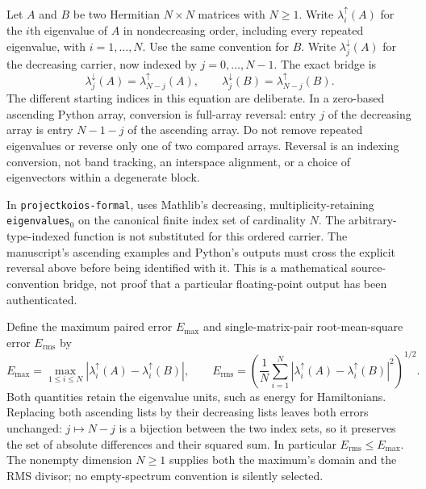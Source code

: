 Let $A$ and $B$ be two Hermitian $N\times N$ matrices with $N\geq1$.
Write $\lambda_i^{\uparrow}(A)$ for the $i$th eigenvalue of $A$ in
nondecreasing order, including every repeated eigenvalue, with
$i=1,\ldots,N$. Use the same convention for $B$.
Write $\lambda_j^{\downarrow}(A)$ for the decreasing carrier, now indexed
by $j=0,\ldots,N-1$. The exact bridge is
\begin{equation}
  \lambda_j^{\downarrow}(A)=\lambda_{N-j}^{\uparrow}(A),
  \qquad
  \lambda_j^{\downarrow}(B)=\lambda_{N-j}^{\uparrow}(B).
  \label{eq:training-spectral-order-reversal}
\end{equation}
The different starting indices in this equation are deliberate. In a
zero-based ascending Python array, conversion is full-array reversal:
entry $j$ of the decreasing array is entry $N-1-j$ of the ascending array.
Do not remove repeated eigenvalues or reverse only one of two compared
arrays. Reversal is an indexing conversion, not band tracking, an
interspace alignment, or a choice of eigenvectors within a degenerate block.

In \texttt{projectkoios-formal},
uses Mathlib's decreasing, multiplicity-retaining \texttt{eigenvalues}\(_0\)
on the canonical finite index set of cardinality $N$.
The arbitrary-type-indexed  function is not substituted
for this ordered carrier. The manuscript's ascending examples and Python's
 outputs must cross the explicit reversal above before being
identified with it. This is a mathematical source-convention bridge, not
proof that a particular floating-point output has been authenticated.

Define the maximum paired error $E_{\max}$ and single-matrix-pair
root-mean-square error $E_{\mathrm{rms}}$ by
\begin{equation}
  E_{\max}=\max_{1\leq i\leq N}
      |\lambda_i^{\uparrow}(A)-\lambda_i^{\uparrow}(B)|,
  \qquad
  E_{\mathrm{rms}}=
    \left(\frac1N\sum_{i=1}^{N}
      |\lambda_i^{\uparrow}(A)-\lambda_i^{\uparrow}(B)|^2\right)^{1/2}.
  \label{eq:training-ordered-spectral-errors}
\end{equation}
Both quantities retain the eigenvalue units, such as energy for Hamiltonians.
Replacing both ascending lists by their decreasing lists leaves both errors
unchanged: $j\mapsto N-j$ is a bijection between the two index sets, so
it preserves the set of absolute differences and their squared sum.
In particular $E_{\mathrm{rms}}\leq E_{\max}$. The nonempty dimension
$N\geq1$ supplies both the maximum's domain and the RMS divisor; no
empty-spectrum convention is silently selected.

